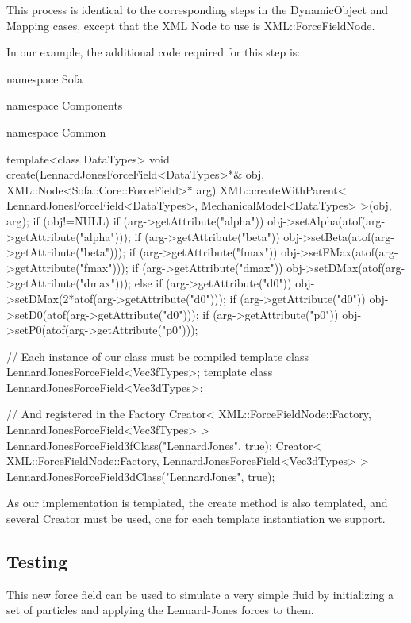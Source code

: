 This process is identical to the corresponding steps in the DynamicObject and Mapping cases, except that the XML Node to use is XML::ForceFieldNode.

In our example, the additional code required for this step is:
\begin{code_cpp}

namespace Sofa { namespace Components { namespace Common {

template<class DataTypes>
void create(LennardJonesForceField<DataTypes>*& obj, XML::Node<Sofa::Core::ForceField>* arg)
{
  XML::createWithParent< LennardJonesForceField<DataTypes>, MechanicalModel<DataTypes> >(obj, arg);
  if (obj!=NULL)
  {
    if (arg->getAttribute("alpha"))  obj->setAlpha(atof(arg->getAttribute("alpha")));
    if (arg->getAttribute("beta"))  obj->setBeta(atof(arg->getAttribute("beta")));
    if (arg->getAttribute("fmax"))  obj->setFMax(atof(arg->getAttribute("fmax")));
    if (arg->getAttribute("dmax"))  obj->setDMax(atof(arg->getAttribute("dmax")));
    else if (arg->getAttribute("d0"))  obj->setDMax(2*atof(arg->getAttribute("d0")));
    if (arg->getAttribute("d0"))  obj->setD0(atof(arg->getAttribute("d0")));
    if (arg->getAttribute("p0"))  obj->setP0(atof(arg->getAttribute("p0")));
  }
} } } }

// Each instance of our class must be compiled
template class LennardJonesForceField<Vec3fTypes>;
template class LennardJonesForceField<Vec3dTypes>;

// And registered in the Factory
Creator< XML::ForceFieldNode::Factory, LennardJonesForceField<Vec3fTypes> > LennardJonesForceField3fClass("LennardJones", true);
Creator< XML::ForceFieldNode::Factory, LennardJonesForceField<Vec3dTypes> > LennardJonesForceField3dClass("LennardJones", true);
\end{code_cpp}

As our implementation is templated, the create method is also templated, and several Creator must be used, one for each template instantiation we support.

\subsection{Testing}

This new force field can be used to simulate a very simple fluid by initializing a set of particles and applying the Lennard-Jones forces to them.

